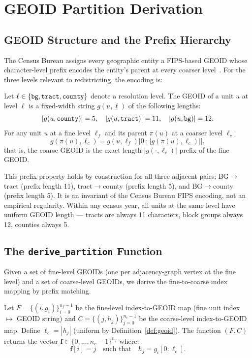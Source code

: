 \section{GEOID Partition Derivation}
\label{sec:geoid}

\subsection{GEOID Structure and the Prefix Hierarchy}

The Census Bureau assigns every geographic entity a FIPS-based GEOID
whose character-level prefix encodes the entity's parent at every coarser
level~\citep{census2020geoids}.
For the three levels relevant to redistricting, the encoding is:

\begin{definition}
\label{def:geoid}
Let $\ell \in \{\texttt{bg}, \texttt{tract}, \texttt{county}\}$ denote a resolution level.
The GEOID of a unit $u$ at level $\ell$ is a fixed-width string $g(u, \ell)$
of the following lengths:
\[
  |g(u, \texttt{county})| = 5, \quad
  |g(u, \texttt{tract})| = 11, \quad
  |g(u, \texttt{bg})| = 12.
\]
For any unit $u$ at a fine level $\ell_f$ and its parent $\pi(u)$ at a
coarser level $\ell_c$:
\[
  g(\pi(u), \ell_c) = g(u, \ell_f)\bigl[0 \,:\, |g(\pi(u), \ell_c)|\bigr],
\]
that is, the coarse GEOID is the exact length-$|g(\cdot,\ell_c)|$ prefix
of the fine GEOID.
\end{definition}

This prefix property holds by construction for all three adjacent pairs:
BG$\to$tract (prefix length 11), tract$\to$county (prefix length 5),
and BG$\to$county (prefix length 5).
It is an invariant of the Census Bureau FIPS encoding, not an empirical
regularity.
Within any census year, all units at the same level have uniform GEOID
length --- tracts are always 11 characters, block groups always 12,
counties always 5.

\subsection{The \texttt{derive\_partition} Function}

Given a set of fine-level GEOIDs (one per adjacency-graph vertex at the
fine level) and a set of coarse-level GEOIDs, we derive the fine-to-coarse
index mapping by prefix matching.

\begin{definition}[\derive{}]
\label{def:derive}
Let $F = \{(i, g_i)\}_{i=0}^{n_f - 1}$ be the fine-level index-to-GEOID
map (fine unit index $\mapsto$ GEOID string) and
$C = \{(j, h_j)\}_{j=0}^{n_c - 1}$ be the coarse-level index-to-GEOID map.
Define $\ell_c = |h_j|$ (uniform by Definition~\ref{def:geoid}).
The function \derive{}$(F, C)$ returns the vector
$\mathbf{f} \in \{0,\ldots,n_c-1\}^{n_f}$ where:
\[
  \mathbf{f}[i] = j
  \quad\text{such that}\quad
  h_j = g_i[0:\ell_c].
\]
\end{definition}

